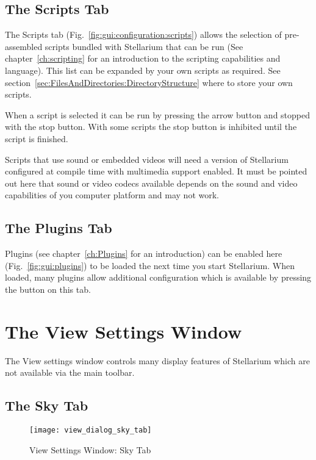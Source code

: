 \subsection{The Scripts Tab}
\label{sec:gui:scripts}


The Scripts tab (Fig.~\ref{fig:gui:configuration:scripts}) allows the
selection of pre-assembled scripts bundled with Stellarium that can be
run (See chapter~\ref{ch:scripting} for an introduction to the
scripting capabilities and language). This list can be expanded by
your own scripts as required. See
section~\ref{sec:FilesAndDirectories:DirectoryStructure} where to
store your own scripts.

When a script is selected it can be run by pressing the arrow button
and stopped with the stop button. With some scripts the stop button is
inhibited until the script is finished. %

Scripts that use sound or embedded videos will need a version of
Stellarium configured at compile time with multimedia support
enabled. It must be pointed out here that sound or video codecs
available depends on the sound and video capabilities of you computer
platform and may not work.


\subsection{The Plugins Tab}
\label{sec:gui:configuration:plugins}


Plugins (see chapter~\ref{ch:Plugins} for an introduction) can be
enabled here (Fig.~\ref{fig:gui:plugins}) to be loaded the next time
you start Stellarium. When loaded, many plugins allow additional configuration
which is available by pressing the  button on this tab.




\section{The View Settings Window}
\label{sec:gui:view}

The View settings window controls many display features of Stellarium
which are not available via the main toolbar.

\subsection{The Sky Tab}
\label{sec:gui:view:sky}

\begin{figure}[t]
\centering\texttt{[image: view\_dialog\_sky\_tab]}
\caption{View Settings Window: Sky Tab}
\label{fig:gui:view:sky}
\end{figure}

